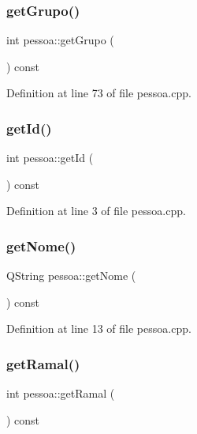 \subsubsection{\texorpdfstring{get\+Grupo()}{getGrupo()}}
{\footnotesize\ttfamily int pessoa\+::get\+Grupo (\begin{DoxyParamCaption}{ }\end{DoxyParamCaption}) const}



Definition at line 73 of file pessoa.\+cpp.

\hypertarget{classpessoa_a9a20cb67d382a667ad8ed10761b50211}{}\label{classpessoa_a9a20cb67d382a667ad8ed10761b50211} 
\subsubsection{\texorpdfstring{get\+Id()}{getId()}}
{\footnotesize\ttfamily int pessoa\+::get\+Id (\begin{DoxyParamCaption}{ }\end{DoxyParamCaption}) const}



Definition at line 3 of file pessoa.\+cpp.

\hypertarget{classpessoa_a83dd5ee7d276187449bb8f337c4864ba}{}\label{classpessoa_a83dd5ee7d276187449bb8f337c4864ba} 
\subsubsection{\texorpdfstring{get\+Nome()}{getNome()}}
{\footnotesize\ttfamily Q\+String pessoa\+::get\+Nome (\begin{DoxyParamCaption}{ }\end{DoxyParamCaption}) const}



Definition at line 13 of file pessoa.\+cpp.

\hypertarget{classpessoa_afe3f63c712664c2ac32f89ed8595d75d}{}\label{classpessoa_afe3f63c712664c2ac32f89ed8595d75d} 
\subsubsection{\texorpdfstring{get\+Ramal()}{getRamal()}}
{\footnotesize\ttfamily int pessoa\+::get\+Ramal (\begin{DoxyParamCaption}{ }\end{DoxyParamCaption}) const}



